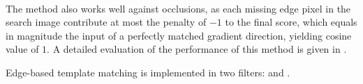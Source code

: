 \paragraph*{}
The method also works well against occlusions, as each missing edge pixel in the search image contribute at most the penalty of $-1$ to the final score, which equals in magnitude the input of a perfectly matched gradient direction, yielding cosine value of $1$. A detailed evaluation of the performance of this method is given in \cite{UlrichSteger02}.

\begin{refImpl}
Edge-based template matching is implemented in two \studio filters:  and .
\end{refImpl}